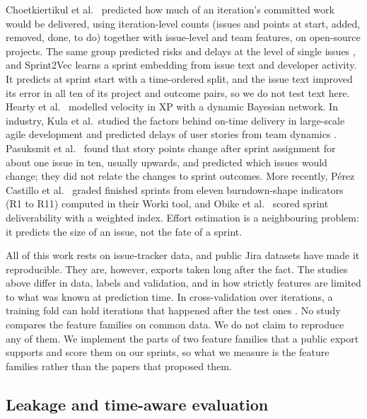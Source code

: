 \documentclass[journal]{IEEEtran}
\begin{document}
Choetkiertikul et al.\ \cite{choet2018} predicted how much of an iteration's committed work would be delivered, using iteration-level counts (issues and points at start, added, removed, done, to do) together with issue-level and team features, on open-source projects. The same group predicted risks and delays at the level of single issues \cite{choet2015,choet2017}, and Sprint2Vec \cite{sprint2vec} learns a sprint embedding from issue text and developer activity. It predicts at sprint start with a time-ordered split, and the issue text improved its error in all ten of its project and outcome pairs, so we do not test text here. Hearty et al.\ \cite{hearty2009} modelled velocity in XP with a dynamic Bayesian network. In industry, Kula et al.\ studied the factors behind on-time delivery in large-scale agile development \cite{kula2022} and predicted delays of user stories from team dynamics \cite{kula2021}. Pasuksmit et al.\ \cite{pasuksmit2022} found that story points change after sprint assignment for about one issue in ten, usually upwards, and predicted which issues would change; they did not relate the changes to sprint outcomes. More recently, P\'erez Castillo et al.\ \cite{perez2024} graded finished sprints from eleven burndown-shape indicators (R1 to R11) computed in their Worki tool, and Obike et al.\ \cite{obike2025} scored sprint deliverability with a weighted index. Effort estimation \cite{choet2019,porru2016,fu2023,tawosi2023} is a neighbouring problem: it predicts the size of an issue, not the fate of a sprint.

All of this work rests on issue-tracker data, and public Jira datasets \cite{tawos,ortu2015,montgomery2022} have made it reproducible. They are, however, exports taken long after the fact. The studies above differ in data, labels and validation, and in how strictly features are limited to what was known at prediction time. In cross-validation over iterations, a training fold can hold iterations that happened after the test ones \cite{choet2018}. No study compares the feature families on common data. We do not claim to reproduce any of them. We implement the parts of two feature families that a public export supports and score them on our sprints, so what we measure is the feature families rather than the papers that proposed them.

\subsection{Leakage and time-aware evaluation}
\end{document}
